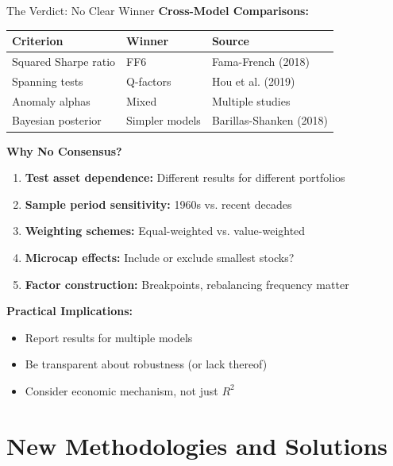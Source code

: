 \documentclass{beamer}
\begin{document}
\begin{frame}{The Verdict: No Clear Winner}
    \textbf{Cross-Model Comparisons:}
    
    \begin{table}
        \footnotesize
        \begin{tabular}{p{3cm}|p{2.5cm}|p{2.5cm}}
            \hline
            \textbf{Criterion} & \textbf{Winner} & \textbf{Source} \\
            \hline
            Squared Sharpe ratio & FF6 & Fama-French (2018) \\
            Spanning tests & Q-factors & Hou et al. (2019) \\
            Anomaly alphas & Mixed & Multiple studies \\
            Bayesian posterior & Simpler models & Barillas-Shanken (2018) \\
            \hline
        \end{tabular}
    \end{table}
    
    
    \textbf{Why No Consensus?}
    \begin{enumerate}
        \item \textbf{Test asset dependence:} Different results for different portfolios
        \item \textbf{Sample period sensitivity:} 1960s vs. recent decades
        \item \textbf{Weighting schemes:} Equal-weighted vs. value-weighted
        \item \textbf{Microcap effects:} Include or exclude smallest stocks?
        \item \textbf{Factor construction:} Breakpoints, rebalancing frequency matter
    \end{enumerate}
    
    
    \textbf{Practical Implications:}
    \begin{itemize}
        \item Report results for multiple models
        \item Be transparent about robustness (or lack thereof)
        \item Consider economic mechanism, not just $R^2$
    \end{itemize}
\end{frame}

\section{New Methodologies and Solutions}
\end{document}
